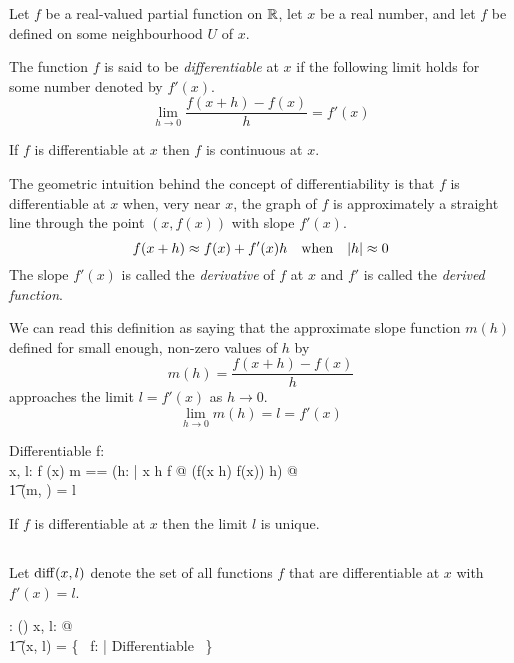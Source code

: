 \documentclass[11pt, oneside]{article}
\begin{document}
Let $f$ be a real-valued partial function on $\mathbb{R}$, let $x$ be a real number,
and let $f$ be defined on some neighbourhood $U$ of $x$.

The function $f$ is said to be {\it differentiable} at $x$ if the following limit holds for some number denoted by $f'(x)$.
$$
\lim_{h \to 0} \frac{f(x+h) - f(x)}{h} = f'(x)
$$

\begin{remark}
If $f$ is differentiable at $x$ then $f$ is continuous at $x$.
\end{remark}

The geometric intuition behind the concept of differentiability is that $f$ is differentiable at $x$
when, very near $x$, the graph of $f$ is approximately a straight line through the point $(x, f(x))$ with slope $f'(x)$.
$$
f(x + h) \approx f(x) + f'(x) h \quad \text{when} \quad \abs{h} \approx 0
$$
The slope $f'(x)$ is called the {\it derivative} of $f$ at $x$
and $f'$ is called the {\it derived function}.

We can read this definition as saying that the approximate slope function $m(h)$ defined for 
small enough, non-zero values of $h$ by
$$
	m(h) = \frac{f(x + h) - f(x)}{h}
$$
approaches the limit $l = f'(x)$ as $h \to 0$.
$$
	\lim_{h\to 0}{m(h)} = l = f'(x)
$$

\begin{schema}{Differentiable}
	f: \R \pfun \R \\
	x, l: \R
\where
	f \in \CzeroR(x)
\also
	\LET m == (\lambda h: \Rnz | x \addR h \in \dom f @ (f(x \addR h) \subR f(x)) \divR h) @ \\
	\t1	\limFR(m, \zeroR) = l
\end{schema}

\begin{remark}
If $f$ is differentiable at $x$ then the limit $l$ is unique.
\end{remark}

\subsection{}

Let $\operatorname{diff}(x,l)$ denote the set of all functions $f$ that are differentiable at $x$ with $f'(x) = l$.

\begin{axdef}
	\diffRR: \R \cross \R \fun \power(\R \pfun \R)
\where
	\forall x, l: \R @ \\
	\t1	\diffRR(x, l) = \{~ f: \R \pfun \R | Differentiable ~\}
\end{axdef}
\end{document}
